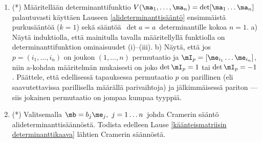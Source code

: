 \begin{enumerate}
\item (*) \label{H-m-5: alidet-tod}
Määritellään determinanttifunktio $V(\ma_1,\ldots,\ma_n)=\det[\ma_1 \ldots \ma_n]$ palautuvasti
käyttäen Lauseen \ref{alideterminanttisääntö} ensimmäistä purkusääntöä ($k=1$) sekä sääntöä
$\,\det a=a\,$ determinantille kokoa $n=1$. \vspace{1mm}\newline
a) Näytä induktiolla, että mainitulla tavalla määritellyllä funktiolla on determinanttifunktion
ominaisuudet (i)--(iii). \vspace{1mm}\newline
b) Näytä, että jos $p=(i_1,\ldots,i_n)$ on joukon $(1,\ldots,n)$ permutaatio ja
$\mI_p=[\me_{i_1} \ldots \me_{i_n}]$, niin a-kohdan määritelmän mukaisesti on joko
$\det\mI_p=1$ tai $\det\mI_p=-1$. Päättele, että edellisessä tapauksessa permutaatio $p$ on
parillinen (eli saavutettavissa parillisella määrällä parivaihtoja) ja jälkimmäisessä pariton
--- siis jokainen permutaatio on jompaa kumpaa tyyppiä.

\item (*) \label{H-m-5: Cramer}
Valitsemalla $\mb=b_j\me_j,\ j=1 \ldots n\,$ johda Cramerin sääntö alideterminanttisäännöstä. 
Todista edelleen Lause \ref{käänteismatriisin determinanttikaava} lähtien Cramerin säännöstä.

\end{enumerate} 